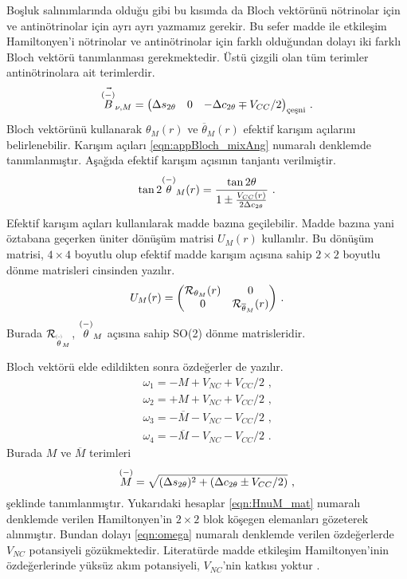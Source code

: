 Boşluk salınımlarında olduğu gibi bu kısımda da Bloch vektörünü nötrinolar için ve antinötrinolar için ayrı ayrı yazmamız gerekir. Bu sefer madde ile etkileşim Hamiltonyen'i nötrinolar ve antinötrinolar için farklı olduğundan dolayı iki farklı Bloch vektörü tanımlanması gerekmektedir. Üstü çizgili olan tüm terimler antinötrinolara ait terimlerdir.
\begin{equation}
	\vec{\barparenBig{B}}_{\nu,M} = \mqty(\Delta s_{2\theta} & 0 & -\Delta c_{2\theta} \mp V_{CC}/2 )_{\text{çeşni}} \text{ .}
\end{equation}
Bloch vektörünü kullanarak $ \theta_{M}(r) $ ve $ \overline{\theta}_{M}(r) $ efektif karışım açılarını belirlenebilir. Karışım açıları \eqref{eqn:appBloch_mixAng} numaralı denklemde tanımlanmıştır. Aşağıda efektif karışım açısının tanjantı verilmiştir.
\begin{equation}\label{eqn:MaddeEtk_EffMixAngCosSin}
	\tan 2\overset{(-)}{\theta}_{M}(r) = \frac{\tan 2\theta}{1\pm \frac{V_{CC}(r)}{2\Delta c_{2\theta}}} \text{ .}
\end{equation}
Efektif karışım açıları kullanılarak madde bazına geçilebilir. Madde bazına yani öztabana geçerken üniter dönüşüm matrisi $ U_{M}(r) $ kullanılır. Bu dönüşüm matrisi, $ 4\times4 $ boyutlu olup efektif madde karışım açısına sahip $ 2\times2 $ boyutlu dönme matrisleri cinsinden yazılır.
\begin{equation}
	U_{M}(r) = \mqty(\mathcal{R}_{\theta_{M}}(r) & 0\\0 & \mathcal{R}_{\overline{\theta}_{M}}(r)) \text{ .}
\end{equation}
Burada $ \mathcal{R}_{\barparen{\theta}_{M}} $, $ \overset{(-)}{\theta}_{M} $ açısına sahip SO(2) dönme matrisleridir.

Bloch vektörü elde edildikten sonra özdeğerler de yazılır.
\begin{align}\label{eqn:omega}
	\nonumber\omega_{1} = {-M + V_{NC}+ V_{CC}/2} \text{ ,}\\
	\nonumber\omega_{2} = {+M + V_{NC}+ V_{CC}/2} \text{ ,}\\
	\nonumber\omega_{3} = {-\overline{M} - V_{NC}- V_{CC}/2} \text{ ,}\\
	\omega_{4} = {-\overline{M} - V_{NC}- V_{CC}/2} \text{ .}
\end{align}
Burada $ M $ ve $ \overline{M} $ terimleri
\begin{equation}
	\overset{(-)}{M} = \sqrt{(\Delta s_{ 2\theta})^{2}+(\Delta c_{2\theta} \pm V_{CC}/2 ) } \text{ ,}
\end{equation}
şeklinde tanımlanmıştır. Yukarıdaki hesaplar \eqref{eqn:HnuM_mat} numaralı denklemde verilen Hamiltonyen'in $ 2\times2 $ blok köşegen elemanları gözeterek alınmıştır. Bundan dolayı \eqref{eqn:omega} numaralı denklemde verilen özdeğerlerde $ V_{NC} $ potansiyeli gözükmektedir. Literatürde madde etkileşim Hamiltonyen'inin özdeğerlerinde yüksüz akım potansiyeli, $ V_{NC} $'nin katkısı yoktur \cite{Giunti:2007ry}.

